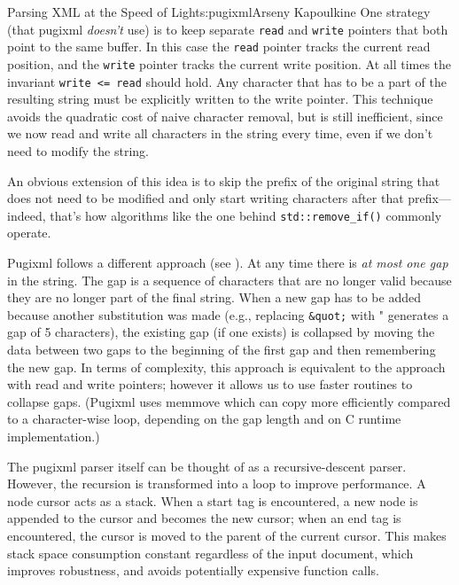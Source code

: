 \begin{aosachapter}{Parsing XML at the Speed of Light}{s:pugixml}{Arseny Kapoulkine}
One strategy (that pugixml \emph{doesn't} use) is to keep separate
\texttt{read} and \texttt{write} pointers that both point to the same
buffer. In this case the \texttt{read} pointer tracks the current read
position, and the \texttt{write} pointer tracks the current write
position. At all times the invariant \texttt{write \textless{}= read}
should hold. Any character that has to be a part of the resulting string
must be explicitly written to the write pointer. This technique avoids
the quadratic cost of naive character removal, but is still inefficient,
since we now read and write all characters in the string every time,
even if we don't need to modify the string.

An obvious extension of this idea is to skip the prefix of the original
string that does not need to be modified and only start writing
characters after that prefix---indeed, that's how algorithms like the
one behind \texttt{std::remove\_if()} commonly operate.

Pugixml follows a different approach (see
). At any time there is \emph{at most
one gap} in the string. The gap is a sequence of characters that are no
longer valid because they are no longer part of the final string. When a
new gap has to be added because another substitution was made (e.g.,
replacing \texttt{\&quot;} with " generates a gap of 5 characters), the
existing gap (if one exists) is collapsed by moving the data between two
gaps to the beginning of the first gap and then remembering the new gap.
In terms of complexity, this approach is equivalent to the approach with
read and write pointers; however it allows us to use faster routines to
collapse gaps. (Pugixml uses memmove which can copy more efficiently
compared to a character-wise loop, depending on the gap length and on C
runtime implementation.)



The pugixml parser itself can be thought of as a recursive-descent
parser. However, the recursion is transformed into a loop to improve
performance. A node cursor acts as a stack. When a start tag is
encountered, a new node is appended to the cursor and becomes the new
cursor; when an end tag is encountered, the cursor is moved to the
parent of the current cursor. This makes stack space consumption
constant regardless of the input document, which improves robustness,
and avoids potentially expensive function calls.


\end{aosachapter}
